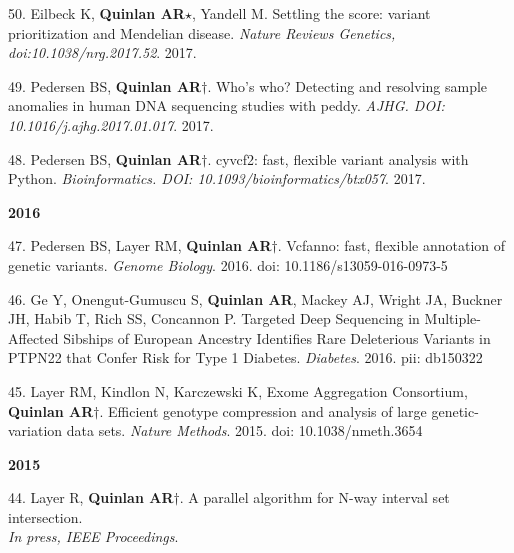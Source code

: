 \documentclass[margin,line]{cv}
\begin{document}
\begin{resume}
\begin{list}{*}{}
    \item[50.] Eilbeck K, \textbf{Quinlan AR}$\star$, Yandell M.
    Settling the score: variant prioritization and Mendelian disease. \emph{Nature Reviews Genetics, doi:10.1038/nrg.2017.52}. 2017.

    \item[49.] Pedersen BS, \textbf{Quinlan AR}$\dagger$.
    Who's who? Detecting and resolving sample anomalies in human DNA  sequencing studies with ​peddy. \emph{AJHG. DOI: 10.1016/j.ajhg.2017.01.017}. 2017. 

    \item[48.] Pedersen BS, \textbf{Quinlan AR}$\dagger$.
    cyvcf2: fast, flexible variant analysis with Python. \emph{Bioinformatics. DOI: 10.1093/bioinformatics/btx057}. 2017. 

    \end{list}


    \textbf{2016} \\

    \begin{list}{*}{}

    \item[47.] Pedersen BS, Layer RM, \textbf{Quinlan AR}$\dagger$.
    Vcfanno: fast, flexible annotation of genetic variants. \emph{Genome Biology}. 2016. doi: 10.1186/s13059-016-0973-5

    \item[46.] Ge Y, Onengut-Gumuscu S, \textbf{Quinlan AR}, Mackey AJ, Wright JA, Buckner JH, Habib T, Rich SS, Concannon P.
    Targeted Deep Sequencing in Multiple-Affected Sibships of European Ancestry Identifies Rare Deleterious Variants in PTPN22 that Confer Risk for Type 1 Diabetes. \emph{Diabetes}. 2016. pii: db150322

    \item[45.] Layer RM, Kindlon N, Karczewski K, Exome Aggregation Consortium, \textbf{Quinlan AR}$\dagger$.
    Efficient genotype compression and analysis of large genetic-variation data sets.
    \emph{Nature Methods}. 2015. doi: 10.1038/nmeth.3654

    \end{list}
    

    \textbf{2015} \\

    \begin{list}{*}{}

    \item[44.] Layer R, \textbf{Quinlan AR}$\dagger$.
    A parallel algorithm for N-way interval set intersection.\\
    \emph{In press, IEEE Proceedings}.


\end{list}
\end{resume}
\end{document}
